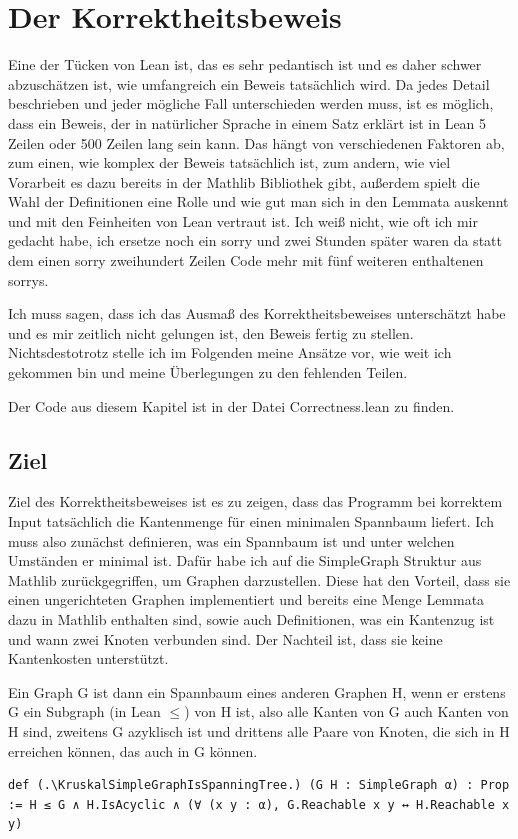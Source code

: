 \section{Der Korrektheitsbeweis}\label{Korrektheitsbeweis}
Eine der Tücken von Lean ist, das es sehr pedantisch ist und es daher schwer abzuschätzen ist, wie umfangreich ein Beweis tatsächlich wird.
Da jedes Detail beschrieben und jeder mögliche Fall unterschieden werden muss, ist es möglich, dass ein Beweis,
der in natürlicher Sprache in einem Satz erklärt ist in Lean 5 Zeilen oder 500 Zeilen lang sein kann.
Das hängt von verschiedenen Faktoren ab, zum einen, wie komplex der Beweis tatsächlich ist, zum andern, wie viel Vorarbeit es dazu bereits in der Mathlib Bibliothek gibt,
außerdem spielt die Wahl der Definitionen eine Rolle und wie gut man sich in den Lemmata auskennt und mit den Feinheiten von Lean vertraut ist.
Ich weiß nicht, wie oft ich mir gedacht habe, ich ersetze noch ein sorry und zwei Stunden später waren da statt dem einen sorry zweihundert Zeilen Code mehr mit fünf weiteren enthaltenen sorrys.

Ich muss sagen, dass ich das Ausmaß des Korrektheitsbeweises unterschätzt habe und es mir zeitlich nicht gelungen ist, den Beweis fertig zu stellen.
Nichtsdestotrotz stelle ich im Folgenden meine Ansätze vor, wie weit ich gekommen bin und meine Überlegungen zu den fehlenden Teilen.

Der Code aus diesem Kapitel ist in der Datei Correctness.lean zu finden.

\subsection{Ziel}
Ziel des Korrektheitsbeweises ist es zu zeigen, dass das Programm bei korrektem Input tatsächlich die Kantenmenge für einen minimalen Spannbaum liefert.
Ich muss also zunächst definieren, was ein Spannbaum ist und unter welchen Umständen er minimal ist.
Dafür habe ich auf die SimpleGraph Struktur aus Mathlib zurückgegriffen, um Graphen darzustellen.
Diese hat den Vorteil, dass sie einen ungerichteten Graphen implementiert und bereits eine Menge Lemmata dazu in Mathlib enthalten sind,
sowie auch Definitionen, was ein Kantenzug ist und wann zwei Knoten verbunden sind.
Der Nachteil ist, dass sie keine Kantenkosten unterstützt.

\begin{definition}[\KruskalSimpleGraphIsSpanningTree]
  Ein Graph G ist dann ein Spannbaum eines anderen Graphen H, wenn er erstens G ein Subgraph (in Lean $\le$) von H ist, also alle Kanten von G auch Kanten von H sind,
  zweitens G azyklisch ist und drittens alle Paare von Knoten, die sich in H erreichen können, das auch in G können.
\end{definition}
\begin{lstlisting}
def (.\KruskalSimpleGraphIsSpanningTree.) (G H : SimpleGraph α) : Prop := H ≤ G ∧ H.IsAcyclic ∧ (∀ (x y : α), G.Reachable x y ↔ H.Reachable x y)
\end{lstlisting}

